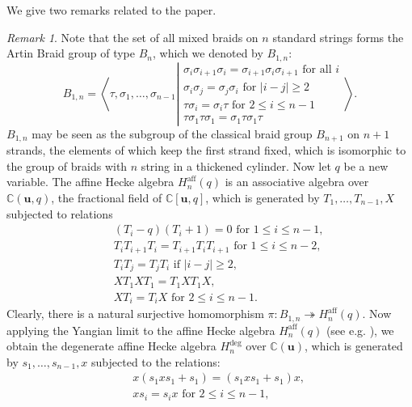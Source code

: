 \documentclass[a4paper, oneside]{amsart}
\numberwithin{equation}{section}
\theoremstyle{definition}
\theoremstyle{remark}
\newtheorem{remark}[equation]{Remark}
\begin{document}
We give two remarks related to the paper.



\begin{remark}Note that the set of all mixed braids on $n$ standard strings forms the Artin Braid group of type $B_n$, which we  denoted by $B_{1,n}$:
\begin{equation*}
  B_{1,n}=\left\langle \tau,\sigma_1,\ldots, \sigma_{n-1}\left| \begin{array}{l}
    \sigma_{i}\sigma_{i+1}\sigma_{i}=\sigma_{i+1}\sigma_{i}\sigma_{i+1}\text{ for all }i\\
    \sigma_i\sigma_j=\sigma_j\sigma_i \text{ for }|i-j|\geq2\\
    \tau\sigma_i=\sigma_i\tau \text{ for } 2\leq i\leq n-1\\
    \tau\sigma_1\tau\sigma_1=\sigma_1\tau\sigma_1\tau
  \end{array} \right\rangle.\right.
\end{equation*}
$B_{1,n}$ may be seen as the subgroup of the classical braid group $B_{n+1}$  on $n+1$
strands, the elements of which keep the first strand fixed, which is isomorphic to the group of  braids with $n$ string in a thickened cylinder.
Now let $q$ be a new variable. The affine Hecke algebra $H^{\mathrm{aff}}_n(q)$ is an associative algebra over $\mathbb{C}(\boldsymbol{u},q)$, the fractional field of $\mathbb{C}[\boldsymbol{u},q]$, which is generated by $T_1,\ldots, T_{n-1}, X$ subjected to relations
\begin{eqnarray*}&&(T_i-q)(T_i+1)=0 \text{ for }1\leq i\leq n-1,\\
  &&T_iT_{i+1}T_i=T_{i+1}T_{i}T_{i+1} \text{ for }1\leq i\leq n-2,\\
  && T_iT_j=T_jT_i \text{ if } |i-j|\geq 2,\\
  &&XT_1XT_1=T_1XT_1X,\\
  && XT_i=T_iX \text{ for }2\leq i\leq n-1.\end{eqnarray*}
Clearly, there is a natural surjective homomorphism $\pi: B_{1,n}\twoheadrightarrow H^{\mathrm{aff}}_n(q)$. Now applying the Yangian limit to the affine Hecke algebra $H^{\mathrm{aff}}_n(q)$ (see e.g. \cite[Remark~5.1]{Isaev-Kirillov}), we obtain the degenerate affine Hecke algebra $H^{\mathrm{deg}}_n$ over $\mathbb{C}(\boldsymbol{u})$, which is generated by $s_1,\ldots, s_{n-1},x$ subjected to the relations:
\begin{eqnarray*}
&&x(s_1xs_1+s_1)=(s_1xs_1+s_1)x,\\
&&xs_i=s_ix\text{ for }2\leq i\leq n-1,\\

\end{eqnarray*}
\end{remark}
\end{document}
